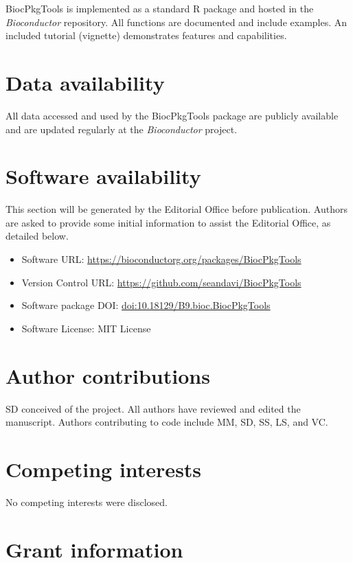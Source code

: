 \documentclass[9pt,a4paper]{extarticle}\usepackage[]{graphicx}\usepackage[]{color}
\begin{document}
BiocPkgTools is implemented as a standard R package and hosted in the
\emph{Bioconductor} repository. All functions are documented and include
examples. An included tutorial (vignette) demonstrates features and
capabilities.

\section*{Data availability} %
All data accessed and used by the BiocPkgTools package are publicly available and are updated regularly at the \emph{Bioconductor} project.

\section*{Software availability}
This section will be generated by the Editorial Office before publication. Authors are asked to provide some initial information to assist the Editorial Office, as detailed below.
\begin{itemize}
\item Software URL: \href{https://bioconductor.org/packages/BiocPkgTools}{https://bioconductorg.org/packages/BiocPkgTools}
\item Version Control URL: \href{https://github.com/seandavi/BiocPkgTools}{https://github.com/seandavi/BiocPkgTools}
\item Software package DOI: \href{https://doi.org/doi:10.18129/B9.bioc.BiocPkgTools}{doi:10.18129/B9.bioc.BiocPkgTools}
\item Software License: MIT License
\end{itemize}



\section*{Author contributions}
SD conceived of the project. All authors have reviewed and edited the manuscript. Authors contributing to code include MM, SD, SS, LS, and VC.


\section*{Competing interests}
No competing interests were disclosed.

\section*{Grant information}
\end{document}
